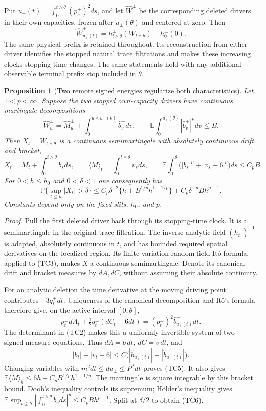 \documentclass[11pt]{article}
\newtheorem{proposition}[theorem]{Proposition}
\theoremstyle{definition}\newtheorem{definition}[theorem]{Definition}
\theoremstyle{remark}\newtheorem{remark}[theorem]{Remark}
\begin{document}
Put $u_\pm(t)=\int_0^{t\wedge\theta}(p_s^\pm)^2ds$, and let
$\widehat W^\pm$ be the corresponding deleted drivers in their own
capacities, frozen after $u_\pm(\theta)$ and centered at zero. Then
\[
 \widehat W^\pm_{u_\pm(t)}
       =h_{t\wedge\theta}^\pm(W_{t\wedge\theta})-h_0^\pm(0).
 \tag{TC3}
\]
The same physical prefix is retained throughout. Its reconstruction
from either driver identifies the stopped natural trace filtrations
and makes these increasing clocks stopping-time changes. The same
statements hold with any additional observable terminal prefix stop
included in $\theta$.

\begin{proposition}[Two remote signed energies regularize both characteristics]
\label{prop:two-slit-characteristic-control}
Let $1<p<\infty$. Suppose the two stopped own-capacity drivers have
continuous martingale decompositions
\[
 \widehat W^\pm_u=\widehat M^\pm_u+
    \int_0^{u\wedge u_\pm(\theta)}\widehat b^\pm_vdv,
 \qquad
 \mathbb E\int_0^{u_\pm(\theta)}|\widehat b^\pm_v|^pdv\le B.
 \tag{TC4}
\]
Then $X_t=W_{t\wedge\theta}$ is a continuous semimartingale with
absolutely continuous drift and bracket,
\[
 X_t=M_t+\int_0^{t\wedge\theta}b_sds,\qquad
 \langle M\rangle_t=\int_0^{t\wedge\theta}v_sds,\qquad
 \mathbb E\int_0^\theta\bigl(|b_s|^p+|v_s-6|^p\bigr)ds\le C_pB.
 \tag{TC5}
\]
For $0<h\le h_0$ and $0<\delta<1$ one consequently has
\[
 \mathbb P\{\sup_{t\le h}|X_t|>\delta\}
 \le C_p\delta^{-2}\{h+B^{1/p}h^{1-1/p}\}
          +C_p\delta^{-p}Bh^{p-1}.
 \tag{TC6}
\]
Constants depend only on the fixed slits, $h_0$, and $p$.
\end{proposition}
\begin{proof}
Pull the first deleted driver back through its stopping-time clock.
It is a semimartingale in the original trace filtration. The inverse
analytic field $(h_t^+)^{-1}$ is adapted, absolutely continuous in
$t$, and has bounded required spatial derivatives on the localized
region. Its finite-variation random-field It\^o formula, applied to
(TC3), makes $X$ a continuous semimartingale. Denote its canonical
drift and bracket measures by $dA,dC$, without assuming their
absolute continuity.

For an analytic deletion the time derivative at the moving driving
point contributes $-3q_t^\pm dt$. Uniqueness of the canonical
decomposition and It\^o's formula therefore give, on the active
interval $[0,\theta]$,
\[
 p_t^\pm dA_t+\tfrac12q_t^\pm(dC_t-6dt)
       =(p_t^\pm)^2\widehat b^\pm_{u_\pm(t)}dt.
 \tag{TC7}
\]
The determinant in (TC2) makes this a uniformly invertible system
of two signed-measure equations. Thus $dA=b\,dt$, $dC=v\,dt$, and
\[
 |b_t|+|v_t-6|\le C\bigl(
       |\widehat b^+_{u_+(t)}|+|\widehat b^-_{u_-(t)}|\bigr).
\]
Changing variables with $m^2dt\le du_\pm\le P^2dt$ proves (TC5).
It also gives
$\mathbb E\langle M\rangle_h\le6h+C_pB^{1/p}h^{1-1/p}$.
The martingale is square integrable by this bracket bound. Doob's
inequality controls its supremum; H\"older's inequality gives
$\mathbb E\sup_{t\le h}|\int_0^{t\wedge\theta}b_sds|^p
\le C_pBh^{p-1}$. Split at $\delta/2$ to obtain (TC6).
\end{proof}
\end{document}
